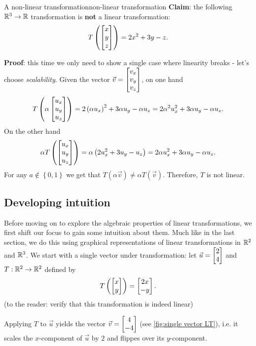 \begin{example}{A non-linear transformation}{non-linear transformation}
	\textbf{Claim}: the following $\mathbb{R}^{3}\to\mathbb{R}$ transformation is \textbf{not} a linear transformation:
	\[
		T\left(\colvec{x;y;z}\right) = 2x^{2}+3y-z.
	\]

	\textbf{Proof}: this time we only need to show a single case where linearity breaks - let's choose \textit{scalability}. Given the vector $\vec{v}=\colvec{v_{x};v_{y};v_{z}}$, on one hand
	\[
		T\left( \alpha\colvec{u_{x};u_{y};u_{z}} \right) = 2\left(\alpha u_{x}\right)^{2}+3\alpha u_{y}-\alpha u_{z} = 2\alpha^{2}u_{x}^{2}+3\alpha u_{y}-\alpha u_{z}.
	\]
	On the other hand
	\[
		\alpha T\left( \colvec{u_{x};u_{y};u_{z}} \right) = \alpha\left( 2u_{x}^{2}+3u_{y}-u_{z} \right) = 2\alpha u_{x}^{2}+3\alpha u_{y}-\alpha u_{z}.
	\]
	For any $a\notin\left\{ 0,1 \right\}$ we get that $T\left( \alpha\vec{v} \right)\neq\alpha T\left( \vec{v} \right)$. Therefore, $T$ is not linear.
\end{example}

\subsection{Developing intuition}
Before moving on to explore the algebraic properties of linear transformations, we first shift our focus to gain some intuition about them. Much like in the last section, we do this using graphical representations of linear transformations in $\mathbb{R}^{2}$ and $\mathbb{R}^{3}$. We start with a single vector under transformation: let $\vec{u}=\colvec{2;4}$ and $T:\mathbb{R}^{2}\to\mathbb{R}^{2}$ defined by
\begin{equation}
	T\left( \colvec{x;y} \right) = \colvec{2x;-y}.
\end{equation}
(to the reader: verify that this transformation is indeed linear)

Applying $T$ to $\vec{u}$ yields the vector $\vec{v}=\colvec{4;-4}$ (see \autoref{fig:single vector LT}), i.e. it scales the $x$-component of $\vec{u}$ by $2$ and flippes over its $y$-component.

